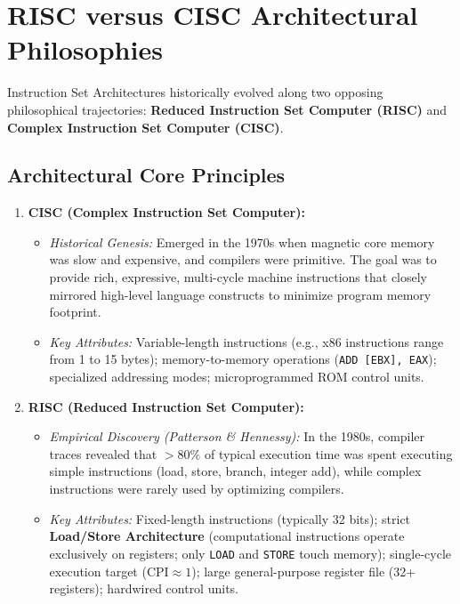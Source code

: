 \section{RISC versus CISC Architectural Philosophies}
\label{sec:risc_vs_cisc}

Instruction Set Architectures historically evolved along two opposing philosophical trajectories: \textbf{Reduced Instruction Set Computer (RISC)} and \textbf{Complex Instruction Set Computer (CISC)}.

\subsection{Architectural Core Principles}
\begin{enumerate}[label=\bfseries\arabic*.]
    \item \textbf{CISC (Complex Instruction Set Computer):}
    \begin{itemize}
        \item \textit{Historical Genesis:} Emerged in the 1970s when magnetic core memory was slow and expensive, and compilers were primitive. The goal was to provide rich, expressive, multi-cycle machine instructions that closely mirrored high-level language constructs to minimize program memory footprint.
        \item \textit{Key Attributes:} Variable-length instructions (e.g., x86 instructions range from 1 to 15 bytes); memory-to-memory operations (\texttt{ADD [EBX], EAX}); specialized addressing modes; microprogrammed ROM control units.
    \end{itemize}
    \item \textbf{RISC (Reduced Instruction Set Computer):}
    \begin{itemize}
        \item \textit{Empirical Discovery (Patterson \& Hennessy):} In the 1980s, compiler traces revealed that $>80\%$ of typical execution time was spent executing simple instructions (load, store, branch, integer add), while complex instructions were rarely used by optimizing compilers.
        \item \textit{Key Attributes:} Fixed-length instructions (typically 32 bits); strict \textbf{Load/Store Architecture} (computational instructions operate exclusively on registers; only \texttt{LOAD} and \texttt{STORE} touch memory); single-cycle execution target ($\text{CPI} \approx 1$); large general-purpose register file (32+ registers); hardwired control units.
    \end{itemize}
\end{enumerate}

